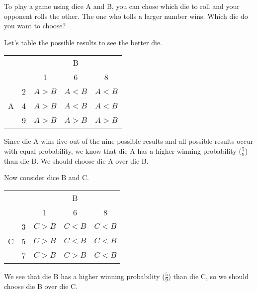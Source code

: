To play a game using dice A and B, you can chose which die to roll and your opponent rolls the other. The one who tolls a larger number wins. Which die do you want to choose?

Let's table the possible results to see the better die.
\begin{center}
  \begin{tabular}{cc|ccc}\hline
    &   & \multicolumn{3}{c}{B} \\
    &   & 1                & 6                & 8                \\ \hline
    \multirow{3}{*}{A}
    & 2 & \color{red}$A>B$ & $A<B$            & $A<B$            \\
    & 4 & \color{red}$A>B$ & $A<B$            & $A<B$            \\
    & 9 & \color{red}$A>B$ & \color{red}$A>B$ & \color{red}$A>B$ \\\hline
  \end{tabular}
\end{center}

Since die A wins five out of the nine possible results and all possible results occur with equal probability, we know that die A has a higher winning probability ($\frac{5}{9}$) than die B. We should choose die A over die B. 

Now consider dice B and C.
\begin{center}
  \begin{tabular}{cc|ccc}\hline
    &   & \multicolumn{3}{c}{B} \\
    &   & 1                & 6                & 8                \\ \hline
    \multirow{3}{*}{C}
    & 3 & \color{red}$C>B$ & $C<B$            & $C<B$            \\
    & 5 & \color{red}$C>B$ & $C<B$            & $C<B$            \\
    & 7 & \color{red}$C>B$ & \color{red}$C>B$ & $C<B$ \\\hline
  \end{tabular}
\end{center}

We see that die B has a higher winning probability ($\frac{5}{9}$) than die C, so we should choose die B over die C. 

